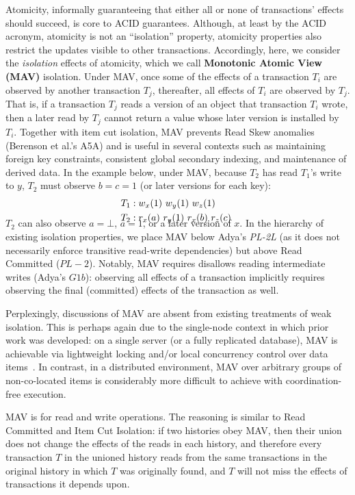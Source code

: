 Atomicity, informally guaranteeing that either all or none of
transactions' effects should succeed, is core to ACID
guarantees. Although, at least by the ACID acronym, atomicity is not
an ``isolation'' property, atomicity properties also restrict the
updates visible to other transactions. Accordingly, here, we consider
the \textit{isolation} effects of atomicity, which we call
\textbf{Monotonic Atomic View (MAV)} isolation.  Under MAV, once some
of the effects of a transaction $T_i$ are observed by another
transaction $T_j$, thereafter, all effects of $T_i$ are observed by
$T_j$. That is, if a transaction $T_j$ reads a version of an object
that transaction $T_i$ wrote, then a later read by $T_j$ cannot return
a value whose later version is installed by $T_i$. Together with item
cut isolation, MAV prevents Read Skew anomalies (Berenson et al.'s
A5A) and is useful in several contexts such as maintaining foreign key
constraints, consistent global secondary indexing, and maintenance of
derived data. In the example below, under MAV, because $T_2$ has read
$T_1$'s write to $y$, $T_2$ must observe $b=c=1$ (or later versions
for each key):
\begin{align*}
\small
T_1 &: w_x(1)~w_y(1)~w_z(1)
\\T_2 &: r_x(a)~r_y(1)~r_x(b)~r_z(c)~\\[-1.5em]
\end{align*}
$T_2$ can also observe $a=\bot$, $a=1$, or a later version of $x$. In
the hierarchy of existing isolation properties, we place MAV below
Adya's \textit{PL-2L} (as it does not necessarily enforce transitive
read-write dependencies) but above Read Committed ($PL-2$). Notably,
MAV requires disallows reading intermediate writes (Adya's $G1b$):
observing all effects of a transaction implicitly requires observing
the final (committed) effects of the transaction as well.

Perplexingly, discussions of MAV are absent from existing treatments of
weak isolation. This is perhaps again due to the single-node context
in which prior work was developed: on a single server (or a fully
replicated database), MAV is achievable via lightweight locking and/or
local concurrency control over data items~\cite{gstore,
  kemme-thesis}. In contrast, in a distributed environment, MAV over
arbitrary groups of non-co-located items is considerably more difficult
to achieve with coordination-free execution.

MAV is \iconfluent for read and write operations. The reasoning is
similar to Read Committed and Item Cut Isolation: if two histories
obey MAV, then their union does not change the effects of the reads in
each history, and therefore every transaction $T$ in the unioned
history reads from the same transactions in the original history in
which $T$ was originally found, and $T$ will not miss the effects of
transactions it depends upon.

